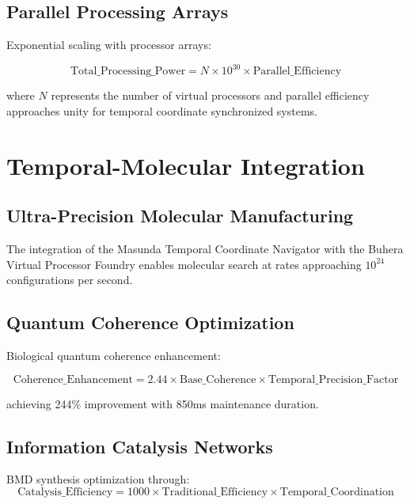 \documentclass[12pt,a4paper]{article}
\begin{document}
\subsection{Parallel Processing Arrays}

Exponential scaling with processor arrays:

\begin{equation}
\text{Total\_Processing\_Power} = N \times 10^{30} \times \text{Parallel\_Efficiency}
\end{equation}

where $N$ represents the number of virtual processors and parallel efficiency approaches unity for temporal coordinate synchronized systems.

\section{Temporal-Molecular Integration}

\subsection{Ultra-Precision Molecular Manufacturing}

The integration of the Masunda Temporal Coordinate Navigator with the Buhera Virtual Processor Foundry enables molecular search at rates approaching $10^{24}$ configurations per second.

\subsection{Quantum Coherence Optimization}

Biological quantum coherence enhancement:

\begin{equation}
\text{Coherence\_Enhancement} = 2.44 \times \text{Base\_Coherence} \times \text{Temporal\_Precision\_Factor}
\end{equation}

achieving 244\% improvement with 850ms maintenance duration.

\subsection{Information Catalysis Networks}

BMD synthesis optimization through:
\begin{equation}
\text{Catalysis\_Efficiency} = 1000 \times \text{Traditional\_Efficiency} \times \text{Temporal\_Coordination}
\end{equation}
\end{document}
